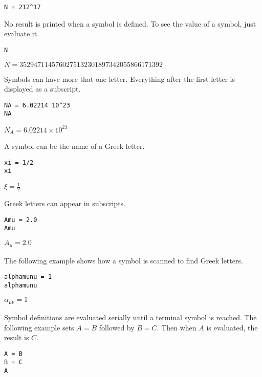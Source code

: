 \documentclass[12pt]{article}
\begin{document}
{\color{blue}
\begin{verbatim}
N = 212^17
\end{verbatim}
}

No result is printed when a symbol is defined.
To see the value of a symbol, just evaluate it.

{\color{blue}
\begin{verbatim}
N
\end{verbatim}
}

$\displaystyle N=3529471145760275132301897342055866171392$

\bigskip

Symbols can have more that one letter.
Everything after the first letter is displayed as a subscript.

{\color{blue}
\begin{verbatim}
NA = 6.02214 10^23
NA
\end{verbatim}
}

$\displaystyle N_A=6.02214\times10^{23}$

\bigskip

A symbol can be the name of a Greek letter.

{\color{blue}
\begin{verbatim}
xi = 1/2
xi
\end{verbatim}
}

$\displaystyle \xi=\tfrac{1}{2}$

\bigskip

Greek letters can appear in subscripts.

{\color{blue}
\begin{verbatim}
Amu = 2.0
Amu
\end{verbatim}
}

$\displaystyle A_\mu=2.0$

\bigskip

The following example shows how a symbol is scanned to find Greek letters.

{\color{blue}
\begin{verbatim}
alphamunu = 1
alphamunu
\end{verbatim}
}

$\displaystyle \alpha_{\mu\nu}=1$

\bigskip

Symbol definitions are evaluated serially until a terminal symbol is reached.
The following example sets $A=B$ followed by $B=C$.
Then when $A$ is evaluated, the result is $C$.

{\color{blue}
\begin{verbatim}
A = B
B = C
A
\end{verbatim}
}
\end{document}

